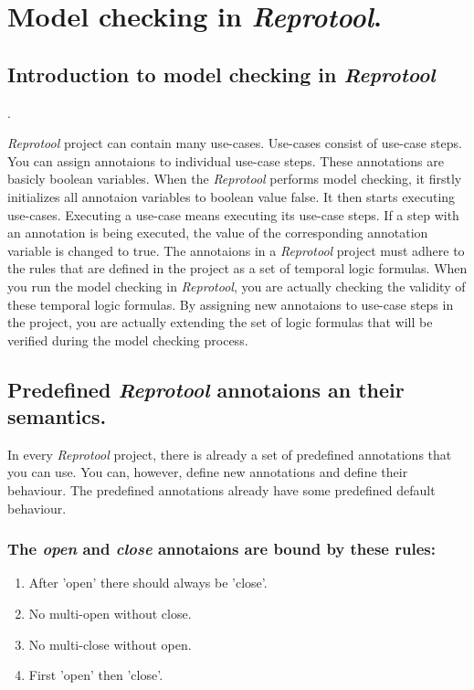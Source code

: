 \section{Model checking in \emph{Reprotool}.}

\subsection{Introduction to model checking in \emph{Reprotool}}.

\emph{Reprotool} project can contain many use-cases. Use-cases consist of use-case steps. You can assign annotaions to individual
use-case steps. These annotations are basicly boolean variables. When the \emph{Reprotool} performs model checking, it firstly
initializes all annotaion variables to boolean value false. It then starts executing use-cases. Executing a use-case means executing
its use-case steps. If a step with an annotation is being executed, the value of the corresponding  annotation variable is changed to true.
The annotaions in a \emph{Reprotool} project must adhere to the rules that are defined in the project as a set of temporal logic
formulas. When you run the model checking in \emph{Reprotool}, you are actually checking the validity of these temporal logic formulas.
By assigning new annotaions to use-case steps in the project, you are actually extending the set of logic formulas that will be verified
during the model checking process.

\subsection{Predefined \emph{Reprotool} annotaions an their semantics.}
In every \emph{Reprotool} project, there is already a set of predefined annotations that you can use. You can, however, define new
annotations and define their behaviour. The predefined annotations already have some predefined default behaviour.

\subsubsection {The \emph{open} and \emph{close} annotaions are bound by these rules:}

\begin{enumerate}
  \item After 'open' there should always be 'close'.
  \item No multi-open without close.
  \item No multi-close without open.
  \item First 'open' then 'close'.
\end{enumerate}

